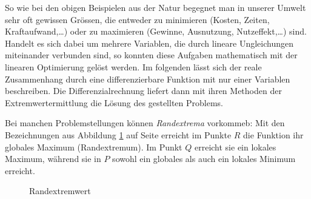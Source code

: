 \documentclass[%
11pt,%
twoside,%
titlepage,%
german,%
headsepline%
]{scrartcl}
\begin{document}
So wie bei den obigen Beispielen aus der Natur begegnet man in unserer Umwelt sehr oft gewissen Gr\"ossen, die entweder zu minimieren (Kosten, Zeiten, Kraftaufwand,\dots) oder zu maximieren (Gewinne, Ausnutzung, Nutzeffekt,\dots) sind. Handelt es sich dabei um mehrere Variablen, die durch lineare Ungleichungen miteinander verbunden sind, so konnten diese Aufgaben mathematisch mit der linearen Optimierung gel\"ost werden. Im folgenden l\"asst sich der reale Zusammenhang durch eine differenzierbare Funktion mit nur einer Variablen beschreiben. Die Differenzialrechnung liefert dann mit ihren Methoden der Extremwertermittlung die L\"osung des gestellten Problems.

\begin{bem}
Bei manchen Problemstellungen können \emph{Randextrema} vorkommeb: Mit den Bezeichnungen aus Abbildung \ref{randextrem} auf Seite \pageref{randextrem} erreicht im Punkte $R$ die Funktion ihr globales Maximum (Randextremum). Im Punkt $Q$ erreicht sie ein lokales Maximum, w\"ahrend sie in $P$ sowohl ein globales als auch ein lokales Minimum erreicht.

\begin{figure}
\begin{center}
\end{center}
\caption{Randextremwert}\label{randextrem}
\end{figure}
\end{bem}
\end{document}
